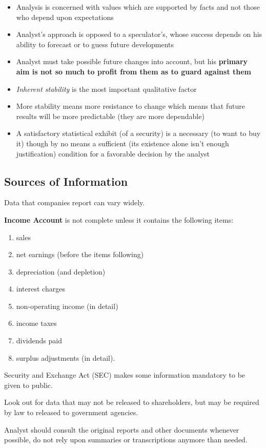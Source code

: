 \documentclass{article}
\begin{document}
\begin{itemize}
\item Analysis is concerned with values which are supported by facts and not those who depend upon expectations
\item Analyst’s approach is opposed to a speculator's, whose success depends on his ability to forecast or to guess future developments
\item Analyst must take possible future changes into account, but his \textbf{primary aim is not so much to profit from them as to guard against them}
\item \textit{Inherent stability} is the most important qualitative factor
\item More stability means more resistance to change which means that future results will be more predictable (they are more dependable)
\item A satisfactory statistical exhibit (of a security) is a necessary (to want to buy it) though by no means a sufficient (its existence alone isn't enough justification) condition for a favorable decision by the analyst
\end{itemize}

\subsection{Sources of Information}
Data that companies report can vary widely. 
\par
\textbf{Income Account} is not complete unless it contains the following items: 
\begin{enumerate}
\item sales
\item net earnings (before the items following)
\item depreciation (and depletion)
\item interest charges
\item non-operating income (in detail)
\item income taxes
\item dividends paid
\item surplus adjustments (in detail).
\end{enumerate}
Security and Exchange Act (SEC) makes some information mandatory to be given to public.
\par
Look out for data that may not be released to shareholders, but may be required by law to released to government agencies.
\par
Analyst should consult the original reports and other documents whenever possible, do not rely upon summaries or transcriptions anymore than needed.
\end{document}
